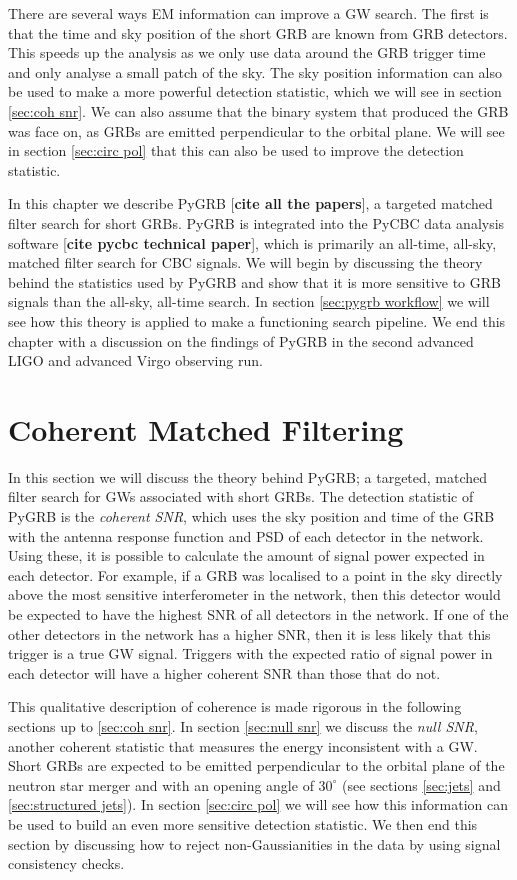 \documentclass[11pt]{cuthesis}
\begin{document}
There are several ways EM information can improve a GW search. The first is that the time and sky position of the short GRB are known from GRB detectors. This speeds up the analysis as we only use data around the GRB trigger time and only analyse a small patch of the sky. The sky position information can also be used to make a more powerful detection statistic, which we will see in section \ref{sec:coh snr}. We can also assume that the binary system that produced the GRB was face on, as GRBs are emitted perpendicular to the orbital plane. We will see in section \ref{sec:circ pol} that this can also be used to improve the detection statistic.  

In this chapter we describe PyGRB [\textbf{cite all the papers}], a targeted matched filter search for short GRBs. PyGRB is integrated into the PyCBC data analysis software [\textbf{cite pycbc technical paper}], which is primarily an all-time, all-sky, matched filter search for CBC signals. We will begin by discussing the theory behind the statistics used by PyGRB and show that it is more sensitive to GRB signals than the all-sky, all-time search. In section \ref{sec:pygrb workflow} we will see how this theory is applied to make a functioning search pipeline. We end this chapter with a discussion on the findings of PyGRB in the second advanced LIGO and advanced Virgo observing run.


\section{Coherent Matched Filtering} \label{sec:PyGRB}
In this section we will discuss the theory behind PyGRB; a targeted, matched filter search for GWs associated with short GRBs. The detection statistic of PyGRB is the \textit{coherent SNR}, which uses the sky position and time of the GRB with the antenna response function and PSD of each detector in the network. Using these, it is possible to calculate the amount of signal power expected in each detector. For example, if a GRB was localised to a point in the sky directly above the most sensitive interferometer in the network, then this detector would be expected to have the highest SNR of all detectors in the network. If one of the other detectors in the network has a higher SNR, then it is less likely that this trigger is a true GW signal. Triggers with the expected ratio of signal power in each detector will have a higher coherent SNR than those that do not. 

This qualitative description of coherence is made rigorous in the following sections up to \ref{sec:coh snr}. In section \ref{sec:null snr} we discuss the \textit{null SNR}, another coherent statistic that measures the energy inconsistent with a GW. Short GRBs are expected to be emitted perpendicular to the orbital plane of the neutron star merger and with an opening angle of $30^\circ$ (see sections \ref{sec:jets} and \ref{sec:structured jets}). In section \ref{sec:circ pol} we will see how this information can be used to build an even more sensitive detection statistic. We then end this section by discussing how to reject non-Gaussianities in the data by using signal consistency checks.
\end{document}
